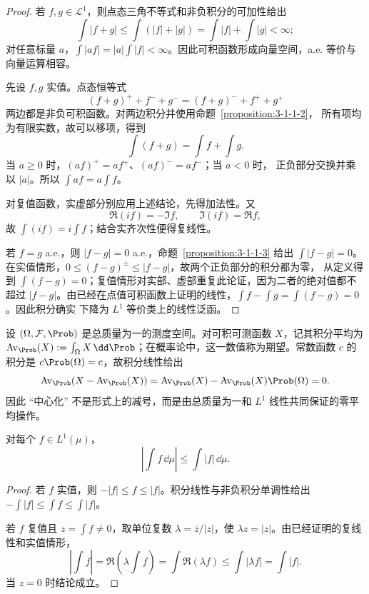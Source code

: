 \begin{proof}
若 $f,g\in\mathcal L^1$，则点态三角不等式和非负积分的可加性给出
\[
 \int|f+g|\leq\int(|f|+|g|)=\int|f|+\int|g|<\infty;
\]
对任意标量 $a$，$\int|af|=|a|\int|f|<\infty$。因此可积函数形成向量空间，a.e. 等价与
向量运算相容。

先设 $f,g$ 实值。点态恒等式
\[
 (f+g)^+ +f^-+g^-
 =(f+g)^-+f^++g^+
 \tag{3.1.19}\label{eq:3-1-linearity-identity}
\]
两边都是非负可积函数。对两边积分并使用命题~\ref{proposition:3-1-1-2}，
所有项均为有限实数，故可以移项，得到
\[
 \int(f+g)=\int f+\int g.
\]
当 $a\geq0$ 时，$(af)^+=af^+$、$(af)^-=af^-$；当 $a<0$ 时，
正负部分交换并乘以 $|a|$。所以 $\int af=a\int f$。

对复值函数，实虚部分别应用上述结论，先得加法性。又
\[
 \Re(if)=-\Im f,
 \qquad \Im(if)=\Re f,
\]
故 $\int(if)=i\int f$；结合实齐次性便得复线性。

若 $f=g$ a.e.，则 $|f-g|=0$ a.e.，命题~\ref{proposition:3-1-1-3} 给出
$\int|f-g|=0$。在实值情形，$0\le(f-g)^\pm\le|f-g|$，故两个正负部分的积分都为零，
从定义得到 $\int(f-g)=0$；复值情形对实部、虚部重复此论证，因为二者的绝对值都不超过
$|f-g|$。由已经在点值可积函数上证明的线性，$\int f-\int g=\int(f-g)=0$。因此积分确实
下降为 $L^1$ 等价类上的线性泛函。
\end{proof}

\begin{example}[积分平均与中心化]\label{ex:3-1-3-expectation}
设 $(\Omega,\mathcal F,\Prob)$ 是总质量为一的测度空间。对可积可测函数 $X$，记其积分平均为
$\operatorname{Av}_{\Prob}(X):=\int_\Omega X\,\dd\Prob$；在概率论中，这一数值称为期望。常数函数
$c$ 的积分是
$c\Prob(\Omega)=c$，故积分线性给出
\[
 \operatorname{Av}_{\Prob}\!\left(X-\operatorname{Av}_{\Prob}(X)\right)
 =\operatorname{Av}_{\Prob}(X)
  -\operatorname{Av}_{\Prob}(X)\Prob(\Omega)=0.
\]
因此 ``中心化'' 不是形式上的减号，而是由总质量为一和 $L^1$ 线性共同保证的零平均操作。
\end{example}

\begin{proposition}[绝对值估计]\label{proposition:3-1-3-1}
对每个 $f\in L^1(\mu)$，
\[
 \left|\int f\,\dd\mu\right|\leq\int|f|\,\dd\mu.
 \tag{3.1.20}\label{eq:3-1-integral-absolute}
\]
\end{proposition}

\begin{proof}
若 $f$ 实值，则 $-|f|\leq f\leq|f|$。积分线性与非负积分单调性给出
$-\int|f|\leq\int f\leq\int|f|$。

若 $f$ 复值且 $z=\int f\ne0$，取单位复数 $\lambda=\overline z/|z|$，使
$\lambda z=|z|$。由已经证明的复线性和实值情形，
\[
 \left|\int f\right|
 =\Re\left(\lambda\int f\right)
 =\int\Re(\lambda f)
 \leq\int|\lambda f|
 =\int|f|.
\]
当 $z=0$ 时结论成立。
\end{proof}

